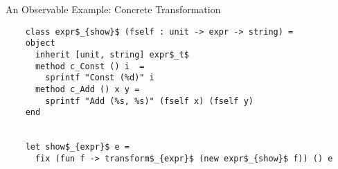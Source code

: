 \documentclass{beamer}
\theoremstyle{definition}
\theoremstyle{plain} %
\begin{document}

\begin{comment}
  Departing from those abstract generic definitions, a concrete transformation~--- show~--- can be implemented.
  First, we need a transformation object. For this we derive a concrete transformation class (we could
  construct an immediate object equally). Note, this class is parameterized with an additional argument~--- a
  function to transform the very same type we deal with. This function is used to implement recursion, and
  we need a fixpoint operator to tie the knot. Note, the type of class \lstinline|expr$_{show}$|  is not
  polymorphic any more; it instantiates all the parameters of the base class into ground types. Note also that
  we reused the generic transformation function~--- there is no pattern matching in the implemetation.
\end{comment}

\begin{frame}[fragile]{An Observable Example: Concrete Transformation}
  \begin{lstlisting}
    class expr$_{show}$ (fself : unit -> expr -> string) =
    object
      inherit [unit, string] expr$_t$ 
      method c_Const () i  =
        sprintf "Const (%d)" i      
      method c_Add () x y =
        sprintf "Add (%s, %s)" (fself x) (fself y)
    end

    
    let show$_{expr}$ e =
      fix (fun f -> transform$_{expr}$ (new expr$_{show}$ f)) () e
  \end{lstlisting}
\end{frame}


\begin{comment}
  We now recap/state the major design choices and properties of our framework:

  1. We use open recursion~--- the generic transformation function is shallow and non-recursive, and we tie the
  knot at the concrete transformation object creation time.

  2. The single generic transformation function is used to implement all concrete transformations.

  3. Neither the generic function nor the generic transformation class are parameterized with transformations for type-parameters.
  This, again, is done on a concrete transformation class/object implementation level.  
\end{comment}
\end{document}
